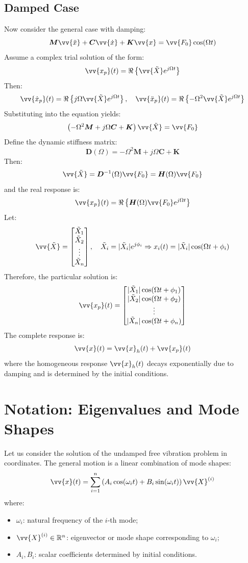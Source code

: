\subsection{Damped Case}

Now consider the general case with damping:
\[
\boldsymbol{M} \vv{\ddot{x}} + \boldsymbol{C} \vv{\dot{x}} + \boldsymbol{K} \vv{x} = \vv{F_0} \cos(\Omega t)
\]
Assume a complex trial solution of the form:
\[
\vv{x_p}(t) = \Re\left\{ \vv{\tilde{X}} e^{j \Omega t} \right\}
\]
Then:
\[
\vv{\dot{x}_p}(t) = \Re\left\{ j \Omega \vv{\tilde{X}} e^{j \Omega t} \right\}, \quad
\vv{\ddot{x}_p}(t) = \Re\left\{ -\Omega^2 \vv{\tilde{X}} e^{j \Omega t} \right\}
\]
Substituting into the equation yields:
\[
\left( -\Omega^2 \boldsymbol{M} + j \Omega \boldsymbol{C} + \boldsymbol{K} \right) \vv{\tilde{X}} = \vv{F_0}
\]
Define the dynamic stiffness matrix:
\[
\boldsymbol{D}(\Omega) = -\Omega^2 \boldsymbol{M} + j \Omega \boldsymbol{C} + \boldsymbol{K}
\]
Then:
\[
\vv{\tilde{X}} = \boldsymbol{D}^{-1}(\Omega) \vv{F_0} = \boldsymbol{H}(\Omega) \vv{F_0}
\]
and the real response is:
\[
\vv{x_p}(t) = \Re\left\{ \boldsymbol{H}(\Omega) \vv{F_0} e^{j \Omega t} \right\}
\]
Let:
\[
\vv{\tilde{X}} = \begin{bmatrix} \tilde{X}_1 \\ \tilde{X}_2 \\ \vdots \\ \tilde{X}_n \end{bmatrix}, \quad \tilde{X}_i = |\tilde{X}_i| e^{j \phi_i} \Rightarrow x_i(t) = |\tilde{X}_i| \cos(\Omega t + \phi_i)
\]
Therefore, the particular solution is:
\[
\vv{x_p}(t) =
\begin{bmatrix}
|\tilde{X}_1| \cos(\Omega t + \phi_1) \\
|\tilde{X}_2| \cos(\Omega t + \phi_2) \\
\vdots \\
|\tilde{X}_n| \cos(\Omega t + \phi_n)
\end{bmatrix}
\]
The complete response is:
\[
\vv{x}(t) = \vv{x}_h(t) + \vv{x_p}(t)
\]
where the homogeneous response \( \vv{x}_h(t) \) decays exponentially due to damping and is determined by the initial conditions.

\section{Notation: Eigenvalues and Mode Shapes}

Let us consider the solution of the undamped free vibration problem in coordinates. The general motion is a linear combination of mode shapes:
\[
\vv{x}(t) = \sum_{i=1}^n \left( A_i \cos(\omega_i t) + B_i \sin(\omega_i t) \right) \vv{X}^{(i)}
\]
where:
\begin{itemize}
    \item \( \omega_i \): natural frequency of the \( i \)-th mode;
    \item \( \vv{X}^{(i)} \in \mathbb{R}^n \): eigenvector or mode shape corresponding to \( \omega_i \);
    \item \( A_i, B_i \): scalar coefficients determined by initial conditions.
\end{itemize}

